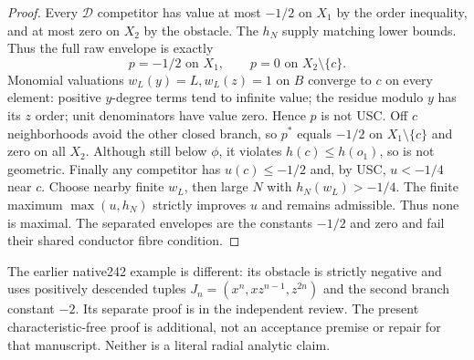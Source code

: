 \documentclass[11pt]{article}
\newcommand{\D}{\mathcal D}
\begin{document}
\begin{proof}
Every $\D$ competitor has value at most $-1/2$ on $X_1$ by the order inequality,
and at most zero on $X_2$ by the obstacle. The $h_N$ supply matching lower bounds.
Thus the full raw envelope is exactly
\[
 p=-1/2\text{ on }X_1,\qquad p=0\text{ on }X_2\setminus\{c\}.
\]
Monomial valuations $w_L(y)=L,w_L(z)=1$ on $B$ converge to $c$ on every
element: positive $y$-degree terms tend to infinite value; the residue modulo
$y$ has its $z$ order; unit denominators have value zero.
Hence $p$ is not USC. Off $c$ neighborhoods avoid the other closed branch,
so $p^*$ equals $-1/2$ on $X_1\setminus\{c\}$ and zero on all $X_2$.
Although still below $\phi$, it violates $h(c)\le h(o_1)$, so is not geometric.
Finally any competitor has $u(c)\le-1/2$ and, by USC, $u<-1/4$ near $c$.
Choose nearby finite $w_L$, then large $N$ with $h_N(w_L)>-1/4$.
The finite maximum $\max(u,h_N)$ strictly improves $u$ and remains admissible.
Thus none is maximal. The separated envelopes are the constants $-1/2$ and
zero and fail their shared conductor fibre condition.
\end{proof}

The earlier native242 example is different: its obstacle is strictly negative
and uses positively descended tuples $J_n=(x^n,xz^{n-1},z^{2n})$ and the second
branch constant $-2$. Its separate proof is in the independent review. The
present characteristic-free proof is additional, not an acceptance premise
or repair for that manuscript. Neither is a literal radial analytic claim.
\end{document}
